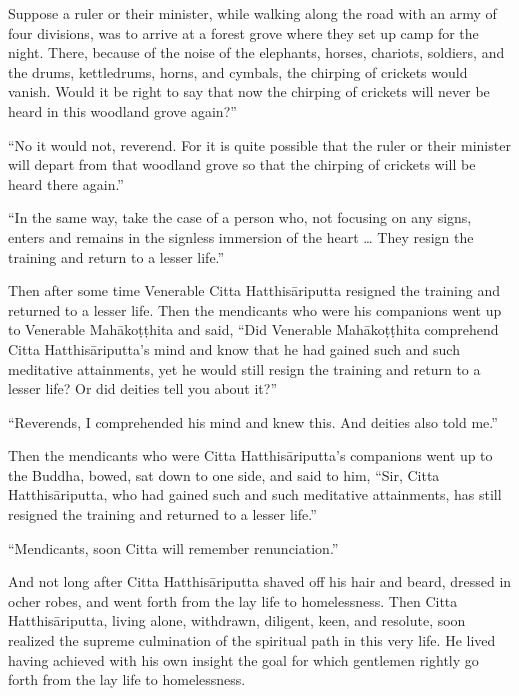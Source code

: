 \documentclass[12pt,openany]{book}%
\begin{document}
Suppose a ruler or their minister, while walking along the road with an army of four divisions, was to arrive at a forest grove where they set up camp for the night. There, because of the noise of the elephants, horses, chariots, soldiers, and the drums, kettledrums, horns, and cymbals, the chirping of crickets would vanish. Would it be right to say that now the chirping of crickets will never be heard in this woodland grove again?” 

“No it would not, reverend. For it is quite possible that the ruler or their minister will depart from that woodland grove so that the chirping of crickets will be heard there again.” 

“In the same way, take the case of a person who, not focusing on any signs, enters and remains in the signless immersion of the heart … They resign the training and return to a lesser life.” 

Then after some time Venerable Citta \textsanskrit{Hatthisāriputta} resigned the training and returned to a lesser life. Then the mendicants who were his companions went up to Venerable \textsanskrit{Mahākoṭṭhita} and said, “Did Venerable \textsanskrit{Mahākoṭṭhita} comprehend Citta \textsanskrit{Hatthisāriputta}’s mind and know that he had gained such and such meditative attainments, yet he would still resign the training and return to a lesser life? Or did deities tell you about it?” 

“Reverends, I comprehended his mind and knew this. And deities also told me.” 

Then the mendicants who were Citta \textsanskrit{Hatthisāriputta}’s companions went up to the Buddha, bowed, sat down to one side, and said to him, “Sir, Citta \textsanskrit{Hatthisāriputta}, who had gained such and such meditative attainments, has still resigned the training and returned to a lesser life.” 

“Mendicants, soon Citta will remember renunciation.” 

And not long after Citta \textsanskrit{Hatthisāriputta} shaved off his hair and beard, dressed in ocher robes, and went forth from the lay life to homelessness. Then Citta \textsanskrit{Hatthisāriputta}, living alone, withdrawn, diligent, keen, and resolute, soon realized the supreme culmination of the spiritual path in this very life. He lived having achieved with his own insight the goal for which gentlemen rightly go forth from the lay life to homelessness. 
\end{document}
